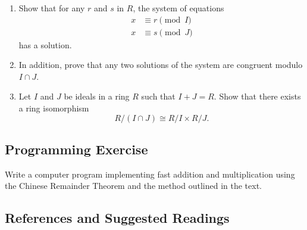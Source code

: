 {\begin{enumerate}
\begin{enumerate}
  \item
Show that for any $r$ and $s$ in $R$, the system of equations
\begin{align*}
x & \equiv  r \pmod{I} \\
x & \equiv  s \pmod{J}
\end{align*}
has a solution.  
 
  \item
In addition, prove that any two solutions of the system are congruent
modulo $I \cap J$. 
 
  \item
Let $I$ and $J$ be ideals in a ring $R$ such that $I + J = R$. Show
that there exists a ring isomorphism
\[
R/(I \cap J) \cong R/I \times R/J.
\]
\end{enumerate}
 
 
 
\end{enumerate}
}
 
 
 
\subsection*{Programming Exercise}
 
 
Write a computer program implementing fast addition and multiplication
using the Chinese Remainder Theorem and the method outlined in the
text. 
 
 
 
\subsection*{References and Suggested Readings}
 
